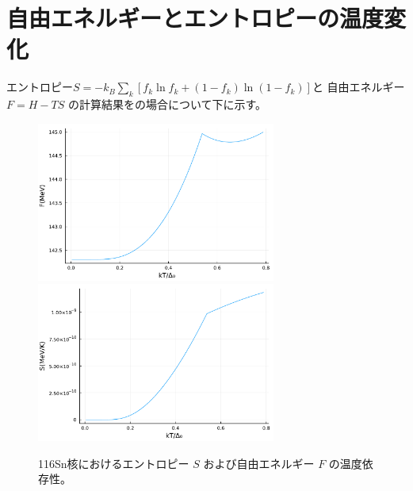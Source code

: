 \documentclass[a4paper,11pt]{jsreport}
\begin{document}
\chapter{自由エネルギーとエントロピーの温度変化}
  \vspace{-10pt}
  エントロピー\(S = -k_B \sum_{k}\left[f_k \ln f_k +(1 -f_k)\ln (1-f_k) \right]\)と
  自由エネルギー\(F=H-TS\)
  の計算結果をの場合について下に示す。
  \vspace{-5pt}
  \begin{figure}[H]
    \centering
    \includegraphics[width=0.7\textwidth]{main_fig/F_kT.pdf}
    \includegraphics[width=0.7\textwidth]{main_fig/S_kT.pdf}
    \caption{116Sn核におけるエントロピー $S$ および自由エネルギー $F$ の温度依存性。}
  \end{figure}
\end{document}
